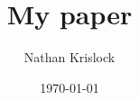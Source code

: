 \documentclass[12pt]{article}
\begin{document}
\title{My paper}
\author{Nathan Krislock}
\date{\today}
\maketitle
\end{document}
